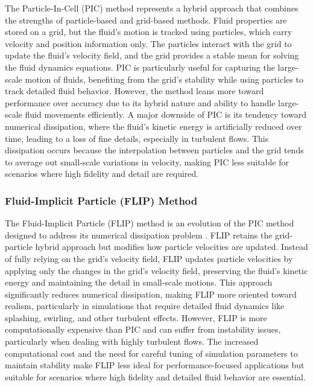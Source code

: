 The Particle-In-Cell (PIC) method represents a hybrid approach that combines the strengths of particle-based and grid-based methods. Fluid properties are stored on a grid, but the fluid's motion is tracked using particles, which carry velocity and position information only. The particles interact with the grid to update the fluid's velocity field, and the grid provides a stable mean for solving the fluid dynamics equations. PIC is particularly useful for capturing the large-scale motion of fluids, benefiting from the grid's stability while using particles to track detailed fluid behavior. However, the method leans more toward performance over accuracy due to its hybrid nature and ability to handle large-scale fluid movements efficiently. A major downside of PIC is its tendency toward numerical dissipation, where the fluid's kinetic energy is artificially reduced over time, leading to a loss of fine details, especially in turbulent flows. This dissipation occurs because the interpolation between particles and the grid tends to average out small-scale variations in velocity, making PIC less suitable for scenarios where high fidelity and detail are required.

\subsubsection{Fluid-Implicit Particle (FLIP) Method}

The Fluid-Implicit Particle (FLIP) method is an evolution of the PIC method designed to address its numerical dissipation problem \cite{Brackbill1988}. FLIP retains the grid-particle hybrid approach but modifies how particle velocities are updated. Instead of fully relying on the grid's velocity field, FLIP updates particle velocities by applying only the changes in the grid's velocity field, preserving the fluid's kinetic energy and maintaining the detail in small-scale motions. This approach significantly reduces numerical dissipation, making FLIP more oriented toward realism, particularly in simulations that require detailed fluid dynamics like splashing, swirling, and other turbulent effects. However, FLIP is more computationally expensive than PIC and can suffer from instability issues, particularly when dealing with highly turbulent flows. The increased computational cost and the need for careful tuning of simulation parameters to maintain stability make FLIP less ideal for performance-focused applications but suitable for scenarios where high fidelity and detailed fluid behavior are essential.

